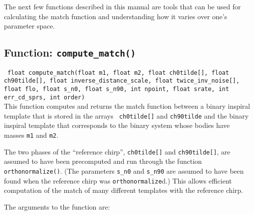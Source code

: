 The next few functions described in this manual are tools that can
be used for calculating the match function and understanding how it
varies over one's parameter space.

\clearpage
\subsection{Function: \tt{compute\_match()}}
\label{ss:compute_match}

{\tt 
float compute\_match(float m1, float m2, float ch0tilde[], float
		    ch90tilde[], float inverse\_distance\_scale, float
		    twice\_inv\_noise[], float flo, float s\_n0, float
		    s\_n90, int npoint, float srate, int err\_cd\_sprs,
		    int order)
}\\
This function computes and returns the match function between
a binary inspiral template that is stored in the arrays {\tt
ch0tilde[]} and {\tt ch90tilde} and the binary inspiral template
that corresponds to the binary system whose bodies have masses {\tt m1}
and {\tt m2}.

The two phases of the ``reference chirp'', {\tt ch0tilde[]} and
{\tt ch90tilde[]}, are assumed to have been precomputed and run
through the function {\tt orthonormalize()}.  (The parameters
{\tt s\_n0} and {\tt s\_n90} are assumed to have been found when
the reference chirp was {\tt orthonormalize}d.)  This allows
efficient computation of the match of many different templates with
the reference chirp.

The arguments to the function are:

